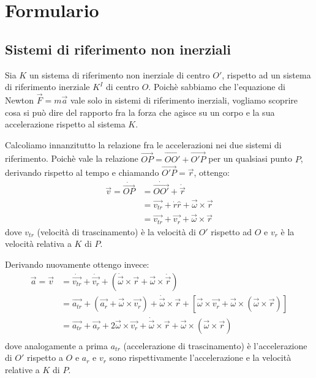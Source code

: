 \documentclass[main.tex]{subfiles}
\begin{document}
\section{Formulario}
\subsection{Sistemi di riferimento non inerziali}
Sia $K$ un sistema di riferimento non inerziale di centro $O'$, rispetto ad un sistema di riferimento
inerziale $K^I$ di centro $O$. Poichè sabbiamo che l'equazione di Newton $\overrightarrow{F}=m\overrightarrow{a}$
vale solo in sistemi di riferimento inerziali, vogliamo scoprire cosa si può dire del rapporto fra la forza
che agisce su un corpo e la sua accelerazione rispetto al sistema $K$.

Calcoliamo innanzitutto la relazione fra le accelerazioni nei due sistemi di riferimento. Poichè vale la
relazione $\overrightarrow{OP}=\overrightarrow{OO'}+\overrightarrow{O'P}$ per un qualsiasi punto $P$, derivando 
rispetto al tempo e chiamando $\overrightarrow{O'P}=\overrightarrow{r}$, ottengo:
\begin{equation}\label{VelNonInerziale}
\begin{split}
	\overrightarrow{v}=\dot{\overrightarrow{OP}}	& =\dot{\overrightarrow{OO'}}+\dot{\overrightarrow{r}}\\
													& =\overrightarrow{v_{tr}}+\dot{r}\hat{r}+\overrightarrow{\omega}\times\overrightarrow{r}\\
													& =\overrightarrow{v_{tr}}+\overrightarrow{v_r}+\overrightarrow{\omega}\times\overrightarrow{r}
\end{split}
\end{equation}
dove $v_{tr}$ (velocità di trascinamento) è la velocità di $O'$ rispetto ad $O$ e $v_r$ è la velocità relativa
a $K$ di $P$.

Derivando nuovamente ottengo invece:
\begin{equation}\label{AccNonInerziale}
\begin{split}
	\overrightarrow{a}=\overrightarrow{v}	& =\dot{\overrightarrow{v_{tr}}}+\dot{\overrightarrow{v_r}}+\left(\dot{\overrightarrow{\omega}}\times\overrightarrow{r}+\overrightarrow{\omega}\times\dot{\overrightarrow{r}}\right)\\
											& =\overrightarrow{a_{tr}}+\left(\overrightarrow{a_r}+\overrightarrow{\omega}\times\overrightarrow{v_r}\right)+\dot{\overrightarrow{\omega}}\times\overrightarrow{r}+\left[\overrightarrow{\omega}\times\overrightarrow{v_r}+\overrightarrow{\omega}\times(\overrightarrow{\omega}\times\overrightarrow{r})\right]\\
											& =\overrightarrow{a_{tr}}+\overrightarrow{a_r}+2\overrightarrow{\omega}\times\overrightarrow{v_r}+\dot{\overrightarrow{\omega}}\times\overrightarrow{r}+\overrightarrow{\omega}\times(\overrightarrow{\omega}\times\overrightarrow{r})\\
\end{split}
\end{equation}
dove analogamente a prima $a_{tr}$ (accelerazione di trascinamento) è l'accelerazione di $O'$ rispetto a $O$ e $a_r$ e 
$v_r$ sono rispettivamente l'accelerazione e la velocità relative a $K$ di $P$.
\end{document}
